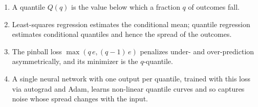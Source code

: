 \documentclass[11pt]{article}
\begin{document}
\begin{enumerate}
  \item A quantile $Q(q)$ is the value below which a fraction $q$ of outcomes fall.
  \item Least-squares regression estimates the conditional mean; quantile
        regression estimates conditional quantiles and hence the spread of the
        outcomes.
  \item The pinball loss $\max(q\,e, (q-1)\,e)$ penalizes under- and
        over-prediction asymmetrically, and its minimizer is the $q$-quantile.
  \item A single neural network with one output per quantile, trained with
        this loss via autograd and Adam, learns non-linear quantile curves and
        so captures noise whose spread changes with the input.
\end{enumerate}
\end{document}

